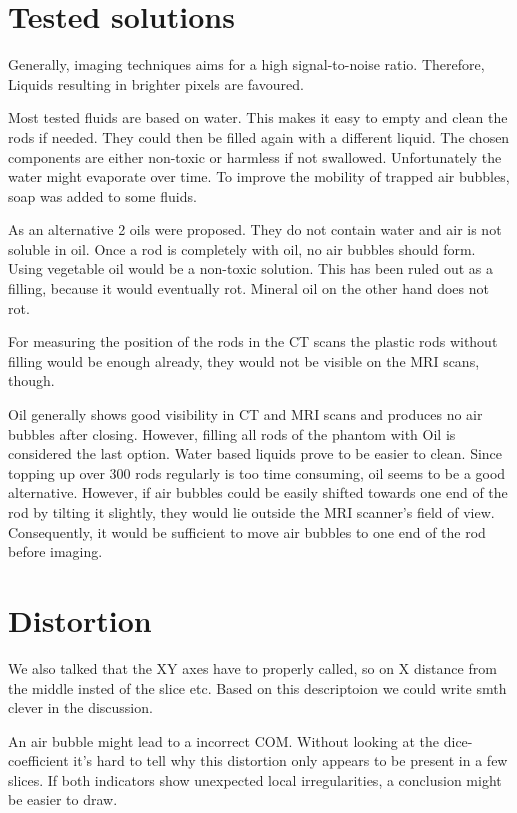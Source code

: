\section{Tested solutions}


Generally, imaging techniques aims for a high signal-to-noise ratio.
Therefore, Liquids resulting in brighter pixels are favoured.

Most tested fluids are based on water. This makes it easy to empty and clean the rods if needed. They could then be filled again with a different liquid.
The chosen components are either non-toxic or harmless if not swallowed.
Unfortunately the water might evaporate over time. To improve the mobility of trapped air bubbles, soap was added to some fluids.

As an alternative 2 oils were proposed. They do not contain water and air is not soluble in oil. Once a rod is completely with oil, no air bubbles should form.
Using vegetable oil would be a non-toxic solution. This has been ruled out as a filling, because it would eventually rot.
Mineral oil on the other hand does not rot.


For measuring the position of the rods in the CT scans the plastic rods without filling would be enough already, they would not be visible on the MRI scans, though.

Oil generally shows good visibility in CT and MRI scans and produces no air bubbles after closing.
However, filling all rods of the phantom with Oil is considered the last option. Water based liquids prove to be easier to clean.
Since topping up over 300 rods regularly is too time consuming, oil seems to be a good alternative.
However, if air bubbles could be easily shifted towards one end of the rod by tilting it slightly, they would lie outside the MRI scanner's field of view.
Consequently, it would be sufficient to move air bubbles to one end of the rod before imaging.



\section{Distortion}

We also talked that the XY axes have to properly called, so on X distance from the middle insted of the slice etc. Based on this descriptoion we could write smth clever in the discussion.  

An air bubble might lead to a incorrect COM. Without looking at the dice-coefficient it's hard to tell why this distortion only appears to be present in a few slices.
If both indicators show unexpected local irregularities, a conclusion might be easier to draw.

